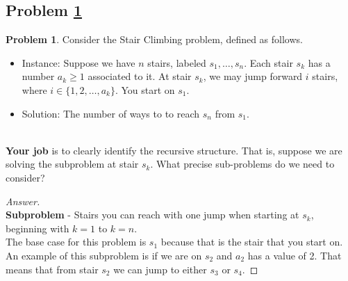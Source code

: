 \documentclass[11pt]{article}
\theoremstyle{definition}
\theoremstyle{definition}
\newtheorem{required}{Problem}
\theoremstyle{definition}
\begin{document}
\subsection{Problem \ref{DP1}}
\begin{required} \label{DP1}
Consider the \textsf{Stair Climbing} problem, defined as follows.
\begin{itemize}
\item \textsf{Instance:} Suppose we have $n$ stairs, labeled $s_{1}, \ldots, s_{n}$. Each stair $s_{k}$ has a number $a_{k} \geq 1$ associated to it. At stair $s_{k}$, we may jump forward $i$ stairs, where $i \in \{ 1, 2, \ldots, a_{k}\}$. You start on $s_{1}$.

\item \textsf{Solution:} The number of ways to to reach $s_{n}$ from $s_{1}$.
\end{itemize}

\noindent \\ \textbf{Your job} is to clearly identify the recursive structure. That is, suppose we are solving the subproblem at stair $s_{k}$. What precise sub-problems do we need to consider?
\end{required}

\begin{proof}[Answer] $ $\\
\textbf{Subproblem} - Stairs you can reach with one jump when starting at $s_k$, beginning with $k=1$ to $k=n$. \\ The base case for this problem is $s_1$ because that is the stair that you start on. An example of this subproblem is if we are on $s_2$ and $a_2$ has a value of 2. That means that from stair $s_2$ we can jump to either $s_3$ or $s_4$. 
\end{proof}



\newpage
\end{document}
